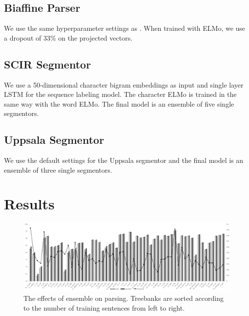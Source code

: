 \documentclass[11pt,a4paper]{article}
\begin{document}
\subsection{Biaffine Parser}
We use the same hyperparameter settings
as \citet{dozat-qi-manning:2017:K17-3}.
When trained with ELMo, we use a dropout of 33\% on the projected vectors.

\subsection{SCIR Segmentor}
We use a 50-dimensional character bigram embeddings as input
and single layer LSTM for the sequence labeling model.
The character ELMo is trained in the same way with the word ELMo.
The final model is an ensemble of five single segmentors.

\subsection{Uppsala Segmentor}
We use the default settings for the Uppsala segmentor and the
final model is an ensemble of three single segmentors.

\section{Results}
\begin{figure}[t]
	\includegraphics[width=\textwidth]{effects_elmo_ensemble}
	\caption{The effects of ensemble on parsing.
		Treebanks are sorted according to the number of training sentences from left to right.}\label{fig:elmo-effect-ens}
\end{figure}

%
\end{document}
